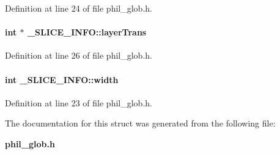 Definition at line 24 of file phil\_\-glob.h.\label{_SLICE_INFO_m4}
\paragraph{\setlength{\rightskip}{0pt plus 5cm}int $\ast$ \_\-SLICE\_\-INFO::layer\-Trans}\hfill



Definition at line 26 of file phil\_\-glob.h.\label{_SLICE_INFO_m2}
\paragraph{\setlength{\rightskip}{0pt plus 5cm}int \_\-SLICE\_\-INFO::width}\hfill



Definition at line 23 of file phil\_\-glob.h.

The documentation for this struct was generated from the following file:\begin{CompactItemize}
\item 
{\bf phil\_\-glob.h}\end{CompactItemize}

